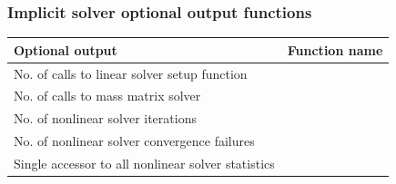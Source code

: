 \documentclass[letterpaper,10pt,english]{sphinxmanual}
\begin{document}
\subsubsection{Implicit solver optional output functions}
\label{c_interface/User_callable:cinterface-arkodeimplicitsolveroutputs}\label{c_interface/User_callable:implicit-solver-optional-output-functions}
\begin{tabulary}{\linewidth}{|L|L|}
\hline
\textbf{\relax 
Optional output
} & \textbf{\relax 
Function name
}\\\hline

No. of calls to linear solver setup function
 & 
{\hyperref[c_interface/User_callable:ARKodeGetNumLinSolvSetups]{}}
\\\hline

No. of calls to mass matrix solver
 & 
{\hyperref[c_interface/User_callable:ARKodeGetNumMassSolves]{}}
\\\hline

No. of nonlinear solver iterations
 & 
{\hyperref[c_interface/User_callable:ARKodeGetNumNonlinSolvIters]{}}
\\\hline

No. of nonlinear solver convergence failures
 & 
{\hyperref[c_interface/User_callable:ARKodeGetNumNonlinSolvConvFails]{}}
\\\hline

Single accessor to all nonlinear solver statistics
 & 
{\hyperref[c_interface/User_callable:ARKodeGetNonlinSolvStats]{}}
\\\hline
\end{tabulary}

\end{document}
